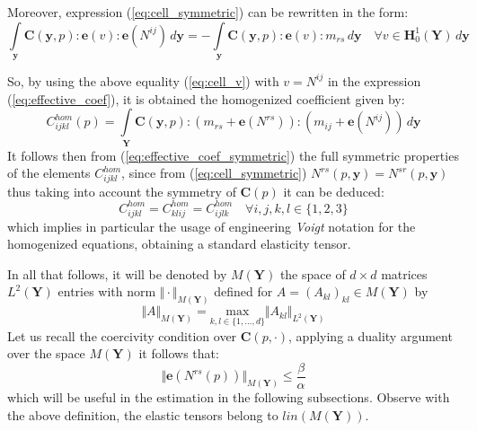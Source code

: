 Moreover, expression (\ref{eq:cell_symmetric}) can be rewritten in the form:
\begin{equation}
    \label{eq:cell_v}
    \int\limits_{\mathbf{y}}\mathbf{C}(\mathbf{y},p):\mathbf{e}(v): \mathbf{e}(N^{ij}) \, d\mathbf{y} = - \int\limits_{\mathbf{y}} \mathbf{C}(\mathbf{y},p):\mathbf{e}(v):m_{rs}\, d\mathbf{y} \quad \forall v \in \mathbf{H}^1_{0}(\mathbf{Y}) \, d\mathbf{y}
\end{equation}

So, by using the above equality (\ref{eq:cell_v}) with $v = N^{ij}$ in the expression (\ref{eq:effective_coef}), it is obtained the homogenized coefficient given by:
\begin{equation}
    \label{eq:effective_coef_symmetric}
    C_{ijkl}^{hom}(p) = \int\limits_{\mathbf{Y}} \mathbf{C}(\mathbf{y},p):(m_{rs}+\mathbf{e}(N^{rs})):(m_{ij}+\mathbf{e}(N^{ij})) \, d\mathbf{y}
\end{equation}
It follows then from (\ref{eq:effective_coef_symmetric}) the full symmetric properties of the elements $C^{hom}_{ijkl}$, since from (\ref{eq:cell_symmetric}) $N^{rs}(p,\mathbf{y}) = N^{sr}(p, \mathbf{y})$ thus taking into account the symmetry of $\mathbf{C}(p)$ it can be deduced:
\begin{equation*}
    C^{hom}_{ijkl} = C^{hom}_{klij} = C^{hom}_{ijlk} \quad \forall i,j,k,l \in \{1,2,3\}
\end{equation*}
which implies in particular the usage of engineering \textit{Voigt} notation for the homogenized equations, obtaining a standard elasticity tensor.

In all that follows, it will be denoted by $M(\mathbf{Y})$ the space of $d \times d$ matrices $L^2(\mathbf{Y})$ entries with norm $\Vert \cdot \Vert_{M(\mathbf{Y})}$ defined for $A = (A_{kl})_{kl} \in M(\mathbf{Y})$ by
\begin{equation}
    \Vert A \Vert_{M(\mathbf{Y})} = \underset{k,l \in \{1,\dots, d\}}{\text{ max }} \Vert A_{kl} \Vert_{L^2(\mathbf{Y})}    
\end{equation}
Let us recall the coercivity condition over $\mathbf{C}(p, \cdot)$, applying a duality argument over the space $M(\mathbf{Y})$ it follows that:
\begin{equation}
    \label{eq:Estimate-Nrs}
    \Vert \mathbf{e}(N^{rs}(p))\Vert_{M(\mathbf{Y})} \leq \frac{\beta}{\alpha}
\end{equation}
which will be useful in the estimation in the following subsections. Observe with the above definition, the elastic tensors belong to $lin(M(\mathbf{Y}))$.
